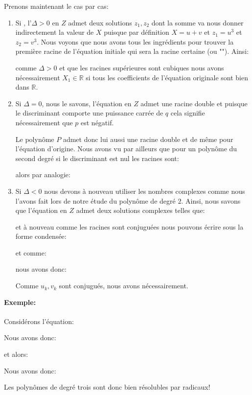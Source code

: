 	Prenons maintenant le cas par cas:
	\begin{enumerate}
		\item Si , l'$\Delta >0$ en $Z$ admet deux solutions $z_1,z_2$ dont la somme va nous donner indirectement la valeur de $X$ puisque par définition $X=u+v$ et $z_1=u^3$ et $z_2=v^3$. Nous voyons que nous avons tous les ingrédients pour trouver la première racine de l'équation initiale qui sera la racine certaine (ou ""). Ainsi:
		
		comme $\Delta>0$ et que les racines supérieures sont cubiques nous avons nécessairement $X_1\in \mathbb{R}$ si tous les coefficients de l'équation originale sont bien dans $\mathbb{R}$.
		
		\item Si $\Delta=0$, nous le savons, l'équation en $Z$ admet une racine double et puisque le discriminant comporte une puissance carrée de $q$ cela signifie nécessairement que $p$ est négatif.

		Le polynôme $P$ admet donc lui aussi une racine double et de même pour l'équation d'origine. Nous avons vu par ailleurs que pour un polynôme du second degré si le discriminant est nul les racines sont:
		
		alors par analogie:
		
		
		\item Si $\Delta<0$ nous devons à nouveau utiliser les nombres complexes comme nous l'avons fait lors de notre étude du polynôme de degré $2$. Ainsi, nous savons que l'équation en $Z$ admet deux solutions complexes telles que:
		
		et à nouveau comme les racines sont conjuguées nous pouvons écrire sous la forme condensée:
		
		et comme:
		
		nous avons donc:
		
		Comme $u_k,v_k$ sont conjugués, nous avons nécessairement.
	\end{enumerate}
	
	\begin{tcolorbox}[colframe=black,colback=white,sharp corners]
	\textbf{{\Large {}}Exemple:}\\\\
	Considérons l'équation:
	
	Nous avons donc:
	
	et alors:
	
	Nous avons donc:
	
	\end{tcolorbox}
	Les polynômes de degré trois sont donc bien résolubles par radicaux!
	
